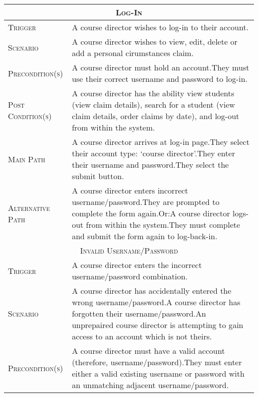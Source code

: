 \documentclass[11pt, english]{article}
\begin{document}
\begin{center}
\begin{longtable}{p{3cm}|p{9cm}}
		\multicolumn{2}{c}{\textsc{Log-In}}\\
		\hline
		\textsc{Trigger} & A course director wishes to log-in to their account.\\
		\textsc{Scenario} & A course director wishes to view, edit, delete or add a personal cirumstances claim.\\
		\textsc{Precondition(s)} & A course director must hold an account.\newline They must use their correct username and password to log-in.\\
		\textsc{Post Condition(s)} & A course director has the ability view students (view claim details), search for a student (view claim details, order claims by date), and log-out from within the system.\\
		\textsc{Main Path} & A course director arrives at log-in page.\newline They select their account type: `course director'.\newline They enter their username and password.\newline They select the submit button.\\
		\textsc{Alternative Path} & A course director enters incorrect username/password.\newline They are prompted to complete the form again.\newline Or:\newline A course director logs-out from within the system.\newline They must complete and submit the form again to log-back-in.\\
		\hline
		\multicolumn{2}{c}{\textsc{Invalid Username/Password}}\\
		\hline
		\textsc{Trigger} & A course director enters the incorrect username/password combination.\\
		\textsc{Scenario} & A course director has accidentally entered the wrong username/password.\newline A course director has forgotten their username/password.\newline An unprepaired course director is attempting to gain access to an account which is not theirs.\\
		\textsc{Precondition(s)} & A course director must have a valid account (therefore, username/password).\newline They must enter either a valid existing username or password with an unmatching adjacent username/password.\\

\end{longtable}
\end{center}
\end{document}
